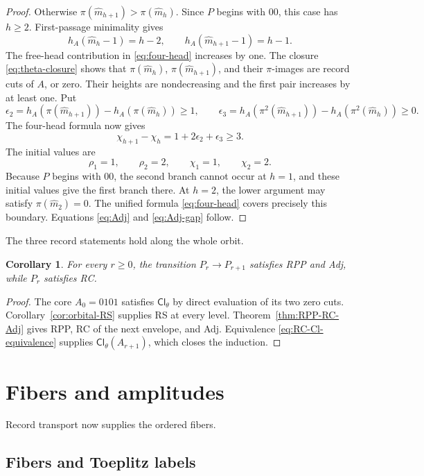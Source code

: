 \documentclass[11pt]{article}
\newtheorem{corollary}[theorem]{Corollary}
\theoremstyle{definition}
\theoremstyle{remark}
\begin{document}
\begin{proof}
Otherwise \(\pi(\widehat m_{h+1})>\pi(\widehat m_h)\).  Since \(P\) begins
with \(00\), this case has \(h\geq2\).  First-passage minimality gives
\[
 h_A(\widehat m_h-1)=h-2,
 \qquad
 h_A(\widehat m_{h+1}-1)=h-1.
\]
The free-head contribution in \eqref{eq:four-head} increases by one.  The
closure \eqref{eq:theta-closure} shows that
\(\pi(\widehat m_h)\), \(\pi(\widehat m_{h+1})\), and their \(\pi\)-images
are record cuts of \(A\), or zero.  Their heights are nondecreasing and the
first pair increases by at least one.  Put
\[
 \epsilon_2=h_A(\pi(\widehat m_{h+1}))
             -h_A(\pi(\widehat m_h))\geq1,
 \qquad
 \epsilon_3=h_A(\pi^2(\widehat m_{h+1}))
             -h_A(\pi^2(\widehat m_h))\geq0.
\]
The four-head formula now gives
\[
 \chi_{h+1}-\chi_h=1+2\epsilon_2+\epsilon_3\geq3.
\]
The initial values are
\[
 \rho_1=1,
 \qquad \rho_2=2,
 \qquad \chi_1=1,
 \qquad \chi_2=2.
\]
Because \(P\) begins with \(00\), the second branch cannot occur at \(h=1\),
and these initial values give the first branch there.  At \(h=2\), the lower
argument may satisfy \(\pi(\widehat m_2)=0\).  The unified
formula \eqref{eq:four-head} covers precisely this boundary.  Equations
\eqref{eq:Adj} and \eqref{eq:Adj-gap} follow.
\end{proof}

The three record statements hold along the whole orbit.
\begin{corollary}
\label{cor:orbital-record-transport}
For every \(r\geq0\), the transition \(P_r\to P_{r+1}\) satisfies RPP and
Adj, while \(P_r\) satisfies RC.
\end{corollary}

\begin{proof}
The core \(A_0=0101\) satisfies \(\mathsf{Cl}_\theta\) by direct evaluation
of its two zero cuts.  Corollary~\ref{cor:orbital-RS} supplies RS at every
level.  Theorem~\ref{thm:RPP-RC-Adj} gives RPP, RC of the next envelope, and
Adj.  Equivalence \eqref{eq:RC-Cl-equivalence} supplies
\(\mathsf{Cl}_\theta(A_{r+1})\), which closes the induction.
\end{proof}

\section{Fibers and amplitudes}
\label{sec:fibers}

Record transport now supplies the ordered fibers.

\subsection{Fibers and Toeplitz labels}
\label{sec:fiber-map}
\end{document}
